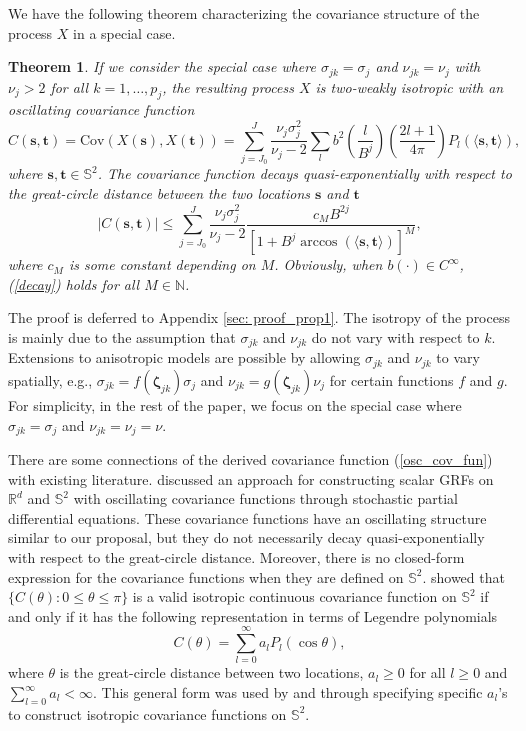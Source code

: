 \documentclass[aoas,preprint]{imsart}
\numberwithin{equation}{section}
\theoremstyle{plain}
\newtheorem{mythm}{Theorem}[section]
\begin{document}
We have the following theorem characterizing the covariance structure of the process $X$ in a special case.
\begin{mythm}\label{cov_fun}
If we consider the special case where $\sigma_{jk} = \sigma_j$ and $\nu_{jk} = \nu_j$ with $\nu_j>2$ for all $k=1,\ldots,p_j$,
the resulting process $X$ is two-weakly isotropic with an oscillating covariance function
\begin{equation}\label{osc_cov_fun}
C(\mathbf{s}, \mathbf{t}) = \mbox{Cov} \left(X(\mathbf{s}), X(\mathbf{t})\right)=\sum \limits_{j=J_0}^J  \frac{\nu_j\sigma_j^2}{\nu_j-2}\sum_l b^2 \left( \frac{l}{B^j} \right)\left(\frac{2l+1}{4\pi}\right)
P_l(\langle \mathbf{s}, \mathbf{t} \rangle),
\end{equation}
where $\mathbf{s}, \mathbf{t} \in \mathbb{S}^2$.
The covariance function decays quasi-exponentially with respect to the great-circle distance between the two locations $\mathbf{s}$ and $\mathbf{t}$
\begin{equation}\label{decay}
\lvert C(\mathbf{s}, \mathbf{t}) \rvert \leq \sum \limits_{j=J_0}^J  \frac{\nu_j\sigma_j^2}{\nu_j-2} \frac{c_M B^{2j}}{[1+B^j \arccos (\langle \mathbf{s}, \mathbf{t} \rangle)]^M},
\end{equation}
where $c_M$ is some constant depending on $M$. Obviously, when $b(\cdot) \in C^{\infty}$, (\ref{decay}) holds for all $M\in \mathbb{N}$.
\end{mythm}
The proof is deferred to Appendix \ref{sec: proof_prop1}. The isotropy of the process is mainly due to the assumption that $\sigma_{jk}$ and $\nu_{jk}$ do not vary with respect to $k$. Extensions to anisotropic models are possible by allowing $\sigma_{jk}$ and $\nu_{jk}$ to vary spatially, e.g., $\sigma_{jk}=f(\bm{\zeta}_{jk})\sigma_j$ and $\nu_{jk}=g(\bm{\zeta}_{jk})\nu_j$ for certain functions $f$ and $g$. For simplicity, in the rest of the paper, we focus on the special case where $\sigma_{jk}=\sigma_j$ and 
$\nu_{jk}=\nu_j=\nu$.

There are some connections of the derived covariance function (\ref{osc_cov_fun}) with existing literature. \citet{Lindgren-11} discussed an approach for constructing scalar GRFs on $\mathbb{R}^d$ and $\mathbb{S}^2$ with oscillating covariance 
functions through stochastic partial differential equations. These covariance functions have an oscillating structure similar to our proposal, but they do not necessarily decay 
quasi-exponentially with respect to the great-circle distance. Moreover, there is no closed-form expression for the covariance functions when they are defined on $\mathbb{S}^2$. \citet{Schoenberg-42} showed that $\{C(\theta): 0\leq \theta \leq \pi\}$ is a valid isotropic continuous covariance function on $\mathbb{S}^2$ if and only if it has the following representation in terms of Legendre polynomials
$$
C(\theta)=\sum \limits_{l=0}^\infty a_lP_l(\cos \theta),
$$
where $\theta$ is the great-circle distance between two locations, $a_l\geq 0$ for all $l\geq 0$ and  $\sum_{l=0}^\infty a_l<\infty$. 
This general form was used by \citet{Terdik-15} and \citet{Guinness-16} through specifying specific $a_l$'s to construct isotropic covariance functions on $\mathbb{S}^2$.
\end{document}

